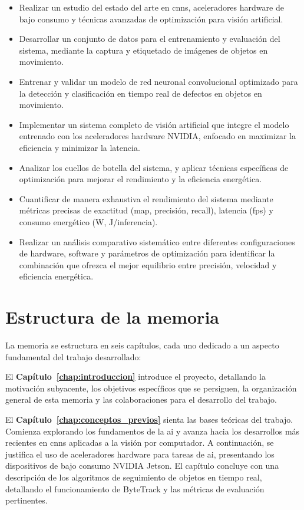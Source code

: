 \documentclass[11pt,spanish,listoffigures,listoftables]{tfgetsinf}
\begin{document}
\begin{itemize}
   \item Realizar un estudio del estado del arte en \glspl{cnn}, aceleradores hardware de bajo consumo y técnicas avanzadas de optimización para visión artificial.
   \item Desarrollar un conjunto de datos para el entrenamiento y evaluación del sistema, mediante la captura y etiquetado de imágenes de objetos en movimiento.
   \item Entrenar y validar un modelo de red neuronal convolucional optimizado para la detección y clasificación en tiempo real de defectos en objetos en movimiento.
   \item Implementar un sistema completo de visión artificial que integre el modelo entrenado con los aceleradores hardware NVIDIA, enfocado en maximizar la eficiencia y minimizar la latencia.
   \item Analizar los cuellos de botella del sistema, y aplicar técnicas específicas de optimización para mejorar el rendimiento y la eficiencia energética.
   \item Cuantificar de manera exhaustiva el rendimiento del sistema mediante métricas precisas de exactitud (\gls{map}, precisión, recall), latencia (\gls{fps}) y consumo energético (W, J/inferencia).
   \item Realizar un análisis comparativo sistemático entre diferentes configuraciones de hardware, software y parámetros de optimización para identificar la combinación que ofrezca el mejor equilibrio entre precisión, velocidad y eficiencia energética.
\end{itemize}

\section{Estructura de la memoria}\label{sec:estructura_memoria}

La memoria se estructura en seis capítulos, cada uno dedicado a un aspecto fundamental del trabajo desarrollado:

El \textbf{Capítulo~\ref{chap:introduccion}} introduce el proyecto, detallando la motivación subyacente, los objetivos específicos que se persiguen, la organización general de esta memoria y las colaboraciones para el desarrollo del trabajo.

El \textbf{Capítulo~\ref{chap:conceptos_previos}} sienta las bases teóricas del trabajo. Comienza explorando los fundamentos de la \gls{ai} y avanza hacia los desarrollos más recientes en \glspl{cnn} aplicadas a la visión por computador. A continuación, se justifica el uso de aceleradores hardware para tareas de \gls{ai}, presentando los dispositivos de bajo consumo NVIDIA Jetson. El capítulo concluye con una descripción de los algoritmos de seguimiento de objetos en tiempo real, detallando el funcionamiento de ByteTrack y las métricas de evaluación pertinentes.
\end{document}
